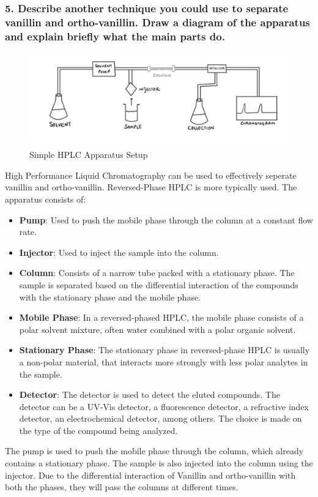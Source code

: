 \documentclass[letterpaper,12pt]{article}
\begin{document}
\subsubsection*{5. Describe another technique you could use to separate vanillin and ortho-vanillin. Draw a diagram of the apparatus and explain briefly what the main parts do.
}
\begin{figure}[!ht]
    \centering
    \includegraphics[width=1\textwidth]{figures/hplc.png}
    \caption{Simple HPLC Apparatus Setup}
\end{figure}
High Performance Liquid Chromatography can be used to effectively seperate vanillin and ortho-vanillin. Reversed-Phase HPLC is more typically used. The apparatus consists of:
\begin{itemize}
    \item \textbf{Pump}: Used to push the mobile phase through the column at a constant flow rate.
    \item \textbf{Injector}: Used to inject the sample into the column.
    \item \textbf{Column}: Consists of a narrow tube packed with a stationary phase. The sample is separated based on the differential interaction of the compounds with the stationary phase and the mobile phase.
    \item \textbf{Mobile Phase}: In a reversed-phased HPLC, the mobile phase consists of a polar solvent mixture, often water combined with a polar organic solvent.
    \item \textbf{Stationary Phase}: The stationary phase in reversed-phase HPLC is usually a non-polar material, that interacts more strongly with less polar analytes in the sample.
    \item \textbf{Detector}: The detector is used to detect the eluted compounds. The detector can be a UV-Vis detector, a fluorescence detector, a refractive index detector, an electrochemical detector, among others. The choice is made on the type of the compound being analyzed.
\end{itemize}
The pump is used to push the mobile phase through the column, which already contains a stationary phase. The sample is also injected into the column using the injector. Due to the differential interaction of Vanillin and ortho-vanillin with both the phases, they will pass the columns at different times.
\end{document}
